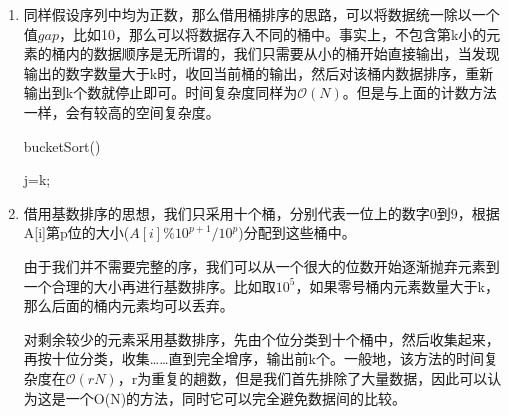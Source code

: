 \documentclass[12pt,a4paper]{article}
\theoremstyle{definition}
\begin{document}
\begin{enumerate}
	\item 同样假设序列中均为正数，那么借用桶排序的思路，可以将数据统一除以一个值$gap$，比如10，那么可以将数据存入不同的桶中。事实上，不包含第k小的元素的桶内的数据顺序是无所谓的，我们只需要从小的桶开始直接输出，当发现输出的数字数量大于k时，收回当前桶的输出，然后对该桶内数据排序，重新输出到k个数就停止即可。时间复杂度同样为$\mathcal{O}(N)$。但是与上面的计数方法一样，会有较高的空间复杂度。
	\begin{center}
		\begin{algorithm}[H]
			\caption{bucketSort()}
			j=k;\\
		\end{algorithm}
	\end{center}
	

	\item 借用基数排序的思想，我们只采用十个桶，分别代表一位上的数字0到9，根据A[i]第p位的大小($A[i]\%10^{p+1}/10^p$)分配到这些桶中。
	
	由于我们并不需要完整的序，我们可以从一个很大的位数开始逐渐抛弃元素到一个合理的大小再进行基数排序。比如取$10^5$，如果零号桶内元素数量大于k，那么后面的桶内元素均可以丢弃。
	
	对剩余较少的元素采用基数排序，先由个位分类到十个桶中，然后收集起来，再按十位分类，收集……直到完全增序，输出前k个。一般地，该方法的时间复杂度在$\mathcal{O}(rN)$，r为重复的趟数，但是我们首先排除了大量数据，因此可以认为这是一个O(N)的方法，同时它可以完全避免数据间的比较。
\end{enumerate}	
	
\end{document}
